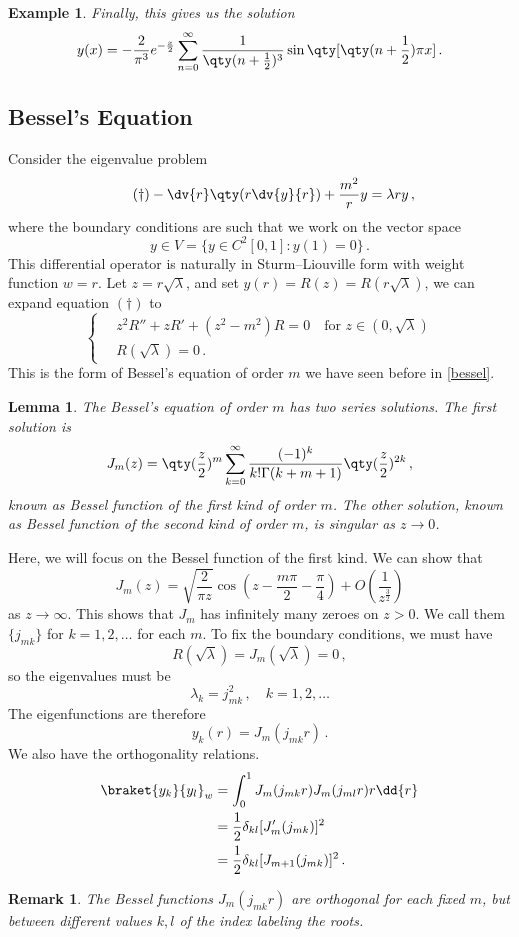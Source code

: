 \documentclass{article}
\theoremstyle{plain}\theoremheaderfont{\normalfont\itshape}\theorembodyfont{\rmfamily}\theoremseparator{.}\newtheorem*{rem}{Remark}\newtheorem*{ex}{Example}\newtheorem*{proof}{Proof}\newtheorem*{altp}{Alternative proof}
\theoremstyle{plain}\theoremheaderfont{\normalfont\bfseries}\theorembodyfont{\rmfamily}\theoremseparator{.}\newtheorem{thm}{Theorem}[section]\newtheorem{lem}[thm]{Lemma}\newtheorem{prop}[thm]{Proposition}\newtheorem*{cor}{Corollary}\newtheorem{defn}[thm]{Definition}\newtheorem{clm}[thm]{Claim}\newtheorem{clminproof}{Claim}
\theoremstyle{break}\theoremheaderfont{\normalfont\itshape}\theorembodyfont{\rmfamily}\theoremseparator{.\medskip}\newtheorem*{proofskip}{Proof}\newtheorem*{exs}{Examples}\newtheorem*{rems}{Remarks}
\theoremstyle{break}\theoremheaderfont{\normalfont\bfseries}\theorembodyfont{\rmfamily}\theoremseparator{.\medskip}\newtheorem{lemskip}[thm]{Lemma}\newtheorem{defnskip}[thm]{Definition}\newtheorem{propskip}[thm]{Proposition}\newtheorem{thmskip}[thm]{Theorem}
\numberwithin{equation}{section}
\begin{document}
\begin{ex}
		Finally, this gives us the solution
		\[y(x)=-\frac{2}{\pi^3}e^{-\frac{x}{2}}\sum_{n=0}^{\infty}\frac{1}{\qty(n+\frac{1}{2})^3}\sin\qty[\qty(n+\frac{1}{2})\pi x]\,.\]
	\end{ex}
	\subsection{Bessel's Equation}
	Consider the eigenvalue problem
	\begin{equation}\tag{\(\dagger\)}
		-\dv{r}\qty(r\dv{y}{r})+\frac{m^2}{r}y=\lambda ry\,,
	\end{equation}
	where the boundary conditions are such that we work on the vector space
	\[y\in V=\{y\in C^2[0,1]:y(1)=0\}\,.\]
	This differential operator is naturally in Sturm--Liouville form with weight function \(w=r\). Let \(z=r\sqrt{\lambda}\), and set \(y(r)=R(z)=R(r\sqrt{\lambda})\), we can expand equation \((\dagger)\) to
	\[\left\{\begin{aligned}
		\,&z^2R''+zR'+(z^2-m^2)R=0 \quad\text{for }z\in(0,\sqrt{\lambda})\\
		\,&R(\sqrt{\lambda})=0\,.
	\end{aligned}\right.\]
	This is the form of Bessel's equation of order \(m\) we have seen before in \cref{bessel}.
	\begin{lem}
		The Bessel's equation of order \(m\) has two series solutions. The first solution is
		\[J_m(z)=\qty(\frac{z}{2})^m\sum_{k=0}^{\infty}\frac{(-1)^k}{k! \Gamma(k+m+1)}\qty(\frac{z}{2})^{2k}\,,\]
		known as \textit{Bessel function of the first kind} of order \(m\). The other solution, known as \textit{Bessel function of the second kind} of order \(m\), is singular as \(z\to 0\).
	\end{lem}
	Here, we will focus on the Bessel function of the first kind. We can show that
	\[J_m(z)=\sqrt{\frac{2}{\pi z}}\cos(z-\frac{m\pi}{2}-\frac{\pi}{4})+O\left(\frac{1}{z^{\frac{3}{2}}}\right)\]
	as \(z\to\infty\). This shows that \(J_m\) has infinitely many zeroes on \(z>0\). We call them \(\{j_{mk}\}\) for \(k=1,2,\dots\) for each \(m\). To fix the boundary conditions, we must have
	\[R(\sqrt{\lambda})=J_m(\sqrt{\lambda})=0\,,\]
	so the eigenvalues must be
	\[\lambda_k=j_{mk}^2\,,\quad k=1,2,\dots\]
	The eigenfunctions are therefore
	\[y_k(r)=J_m(j_{mk}r)\,.\]
	We also have the orthogonality relations.
	\begin{align*}
		\braket{y_k}{y_l}_w&=\int_{0}^{1}J_m(j_{mk}r)J_m(j_{ml}r)r\dd{r}\\
		&=\frac{1}{2}\delta_{kl}[J_m'(j_{mk})]^2\\
		&=\frac{1}{2}\delta_{kl}[J_{m+1}(j_{mk})]^2\,.
	\end{align*}
	\begin{rem}
		The Bessel functions \(J_m(j_{mk}r)\) are orthogonal for each fixed \(m\), but between different values \(k,l\) of the index labeling the roots.
	\end{rem}
\end{document}

